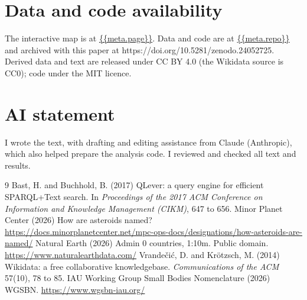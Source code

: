 \documentclass[11pt,a4paper]{article}
\begin{document}
\section*{Data and code availability}
The interactive map is at \url{{{meta.page}}}. Data and code are at \url{{{meta.repo}}} and archived with this paper at https://doi.org/10.5281/zenodo.24052725. Derived data and text are released under CC BY 4.0 (the Wikidata source is CC0); code under the MIT licence.

\section*{AI statement}
I wrote the text, with drafting and editing assistance from Claude (Anthropic), which also helped prepare the analysis code. I reviewed and checked all text and results.

\begin{thebibliography}{9}
 Bast, H. and Buchhold, B. (2017) QLever: a query engine for efficient SPARQL+Text search. In \textit{Proceedings of the 2017 ACM Conference on Information and Knowledge Management (CIKM)}, 647 to 656.
 Minor Planet Center (2026) How are asteroids named? \url{https://docs.minorplanetcenter.net/mpc-ops-docs/designations/how-asteroids-are-named/}
 Natural Earth (2026) Admin 0 countries, 1:10m. Public domain. \url{https://www.naturalearthdata.com/}
 Vrande\v{c}i\'c, D. and Kr\"otzsch, M. (2014) Wikidata: a free collaborative knowledgebase. \textit{Communications of the ACM} 57(10), 78 to 85.
 IAU Working Group Small Bodies Nomenclature (2026) WGSBN. \url{https://www.wgsbn-iau.org/}
\end{thebibliography}
\end{document}
